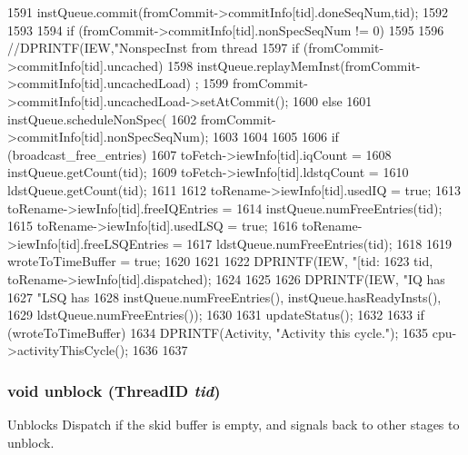 \begin{DoxyCode}
{{{1591             instQueue.commit(fromCommit->commitInfo[tid].doneSeqNum,tid);
1592         }
1593 
1594         if (fromCommit->commitInfo[tid].nonSpecSeqNum != 0) {
1595 
1596             //DPRINTF(IEW,"NonspecInst from thread %
1597             if (fromCommit->commitInfo[tid].uncached) {
1598                 instQueue.replayMemInst(fromCommit->commitInfo[tid].uncachedLoad)
      ;
1599                 fromCommit->commitInfo[tid].uncachedLoad->setAtCommit();
1600             } else {
1601                 instQueue.scheduleNonSpec(
1602                     fromCommit->commitInfo[tid].nonSpecSeqNum);
1603             }
1604         }
1605 
1606         if (broadcast_free_entries) {
1607             toFetch->iewInfo[tid].iqCount =
1608                 instQueue.getCount(tid);
1609             toFetch->iewInfo[tid].ldstqCount =
1610                 ldstQueue.getCount(tid);
1611 
1612             toRename->iewInfo[tid].usedIQ = true;
1613             toRename->iewInfo[tid].freeIQEntries =
1614                 instQueue.numFreeEntries(tid);
1615             toRename->iewInfo[tid].usedLSQ = true;
1616             toRename->iewInfo[tid].freeLSQEntries =
1617                 ldstQueue.numFreeEntries(tid);
1618 
1619             wroteToTimeBuffer = true;
1620         }
1621 
1622         DPRINTF(IEW, "[tid:%
1623                 tid, toRename->iewInfo[tid].dispatched);
1624     }
1625 
1626     DPRINTF(IEW, "IQ has %
1627             "LSQ has %
1628             instQueue.numFreeEntries(), instQueue.hasReadyInsts(),
1629             ldstQueue.numFreeEntries());
1630 
1631     updateStatus();
1632 
1633     if (wroteToTimeBuffer) {
1634         DPRINTF(Activity, "Activity this cycle.\n");
1635         cpu->activityThisCycle();
1636     }
1637 }
\end{DoxyCode}
\hypertarget{classDefaultIEW_a2c95e7e16c04d20ba742b9e97a4f0809}{
\subsubsection[{unblock}]{\setlength{\rightskip}{0pt plus 5cm}void unblock ({\bf ThreadID} {\em tid})}}
\label{classDefaultIEW_a2c95e7e16c04d20ba742b9e97a4f0809}
Unblocks Dispatch if the skid buffer is empty, and signals back to other stages to unblock. 


